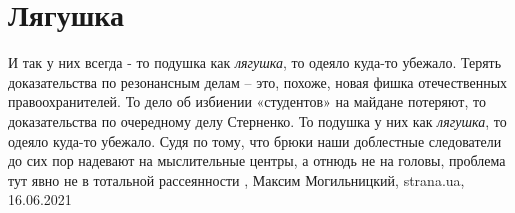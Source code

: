  
 
 
 
 
\chapter{Лягушка}
\label{sec:slova.ljagushka}

И так у них всегда - то подушка как \emph{лягушка}, то одеяло куда-то убежало.
Терять доказательства по резонансным делам – это, похоже, новая фишка
отечественных правоохранителей. То дело об избиении «студентов» на майдане
потеряют, то доказательства по очередному делу Стерненко. То подушка у них как
\emph{лягушка}, то одеяло куда-то убежало.  Судя по тому, что брюки наши
доблестные следователи до сих пор надевают на мыслительные центры, а отнюдь не
на головы, проблема тут явно не в тотальной рассеянности
, 
Максим Могильницкий, strana.ua, 16.06.2021
